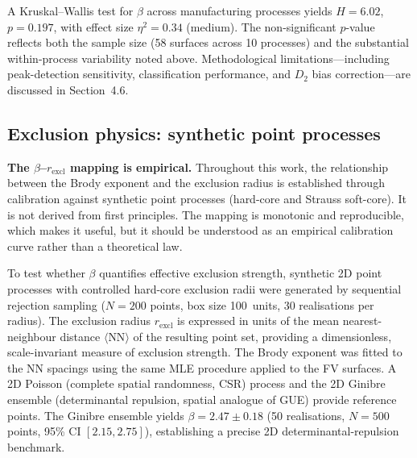 \documentclass[final,1p,times]{elsarticle}
\theoremstyle{definition}
\begin{document}
A Kruskal--Wallis test for $\beta$ across manufacturing
processes yields $H = 6.02$, $p = 0.197$, with effect size
$\eta^2 = 0.34$ (medium). The non-significant $p$-value reflects
both the sample size (58 surfaces across 10 processes) and the
substantial within-process variability noted above.
Methodological limitations---including peak-detection sensitivity,
classification performance, and $D_2$ bias correction---are
discussed in Section~4.6.

\subsection{Exclusion physics: synthetic point processes}

\textbf{The $\beta$--$r_{\text{excl}}$ mapping is empirical.}
Throughout this work, the relationship between the Brody exponent
and the exclusion radius is established through calibration against
synthetic point processes (hard-core and Strauss soft-core). It is
not derived from first principles. The mapping is monotonic and
reproducible, which makes it useful, but it should be understood
as an empirical calibration curve rather than a theoretical law.

To test whether $\beta$ quantifies effective exclusion strength,
synthetic 2D point
processes with controlled hard-core exclusion radii were
generated by sequential rejection sampling ($N=200$ points,
box size 100~units, 30 realisations per radius). The exclusion
radius $r_{\text{excl}}$ is expressed in units of the mean
nearest-neighbour distance $\langle\text{NN}\rangle$ of the
resulting point set, providing a dimensionless, scale-invariant
measure of exclusion strength. The Brody exponent was fitted to
the NN spacings using the same MLE procedure applied to the FV
surfaces. A 2D Poisson (complete spatial randomness, CSR)
process and the 2D Ginibre ensemble (determinantal repulsion,
spatial analogue of GUE) provide reference points. The Ginibre
ensemble yields $\beta = 2.47 \pm 0.18$ (50 realisations,
$N=500$ points, 95\% CI $[2.15, 2.75]$), establishing a precise
2D determinantal-repulsion benchmark.
\end{document}
